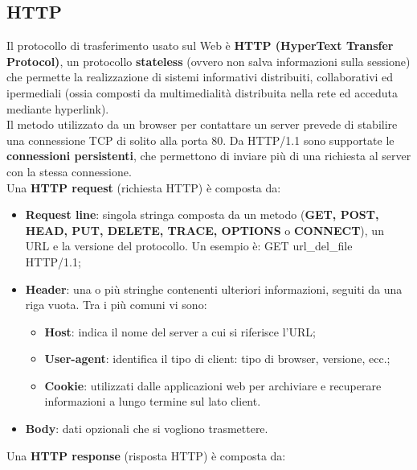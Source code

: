 \subsection{HTTP}
    Il protocollo di trasferimento usato sul Web è \textbf{HTTP (HyperText Transfer Protocol)}, un
    protocollo \textbf{stateless} (ovvero non salva informazioni sulla sessione) che permette la
    realizzazione di sistemi informativi distribuiti, collaborativi ed ipermediali (ossia composti da
    multimedialità distribuita nella rete ed acceduta mediante hyperlink).\\

    Il metodo utilizzato da un browser per contattare un server prevede di stabilire una
    connessione TCP di solito alla porta 80. Da HTTP/1.1 sono supportate le \textbf{connessioni
    persistenti}, che permettono di inviare più di una richiesta al server con la stessa connessione.\\

    Una \textbf{HTTP request} (richiesta HTTP) è composta da:

        \begin{itemize}
            \item \textbf{Request line}: singola stringa composta da un metodo (\textbf{GET, POST, HEAD, PUT,
            DELETE, TRACE, OPTIONS} o \textbf{CONNECT}), un URL e la versione del protocollo.
            Un esempio è: GET url_del_file HTTP/1.1;
            \item \textbf{Header}: una o più stringhe contenenti ulteriori informazioni, seguiti da una riga vuota.
            Tra i più comuni vi sono:

            \begin{itemize}
                \item \textbf{Host}: indica il nome del server a cui si riferisce l’URL;
                \item \textbf{User-agent}: identifica il tipo di client: tipo di browser, versione, ecc.;
                \item \textbf{Cookie}: utilizzati dalle applicazioni web per archiviare e recuperare
                informazioni a lungo termine sul lato client.
            \end{itemize}

            \item \textbf{Body}: dati opzionali che si vogliono trasmettere.
        \end{itemize}

    Una \textbf{HTTP response} (risposta HTTP) è composta da:

